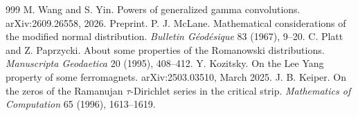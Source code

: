 \begin{thebibliography}{999}
 M. Wang and S. Yin. Powers of generalized gamma convolutions. arXiv:2609.26558, 2026. Preprint. %
 P. J. McLane. Mathematical considerations of the modified normal distribution. \emph{Bulletin G\'eod\'esique} 83 (1967), 9--20. %
 C. Platt and Z. Paprzycki. About some properties of the Romanowski distributions. \emph{Manuscripta Geodaetica} 20 (1995), 408--412. %
 Y. Kozitsky. On the Lee Yang property of some ferromagnets. arXiv:2503.03510, March 2025. %
 J. B. Keiper. On the zeros of the Ramanujan $\tau$-Dirichlet series in the critical strip. \emph{Mathematics of Computation} 65 (1996), 1613--1619. %
\end{thebibliography}
